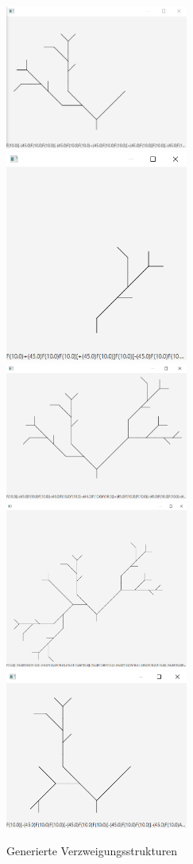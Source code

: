 \begin{figure}[H]
    \includegraphics[width=6cm]{../images/example_1.png}
    \includegraphics[width=6cm]{../images/example_2.png}
    \includegraphics[width=6cm]{../images/example_3.png}
    \includegraphics[width=6cm]{../images/example_4.png}
    \includegraphics[width=6cm]{../images/example_5.png}
    \caption{Generierte Verzweigungsstrukturen}
    \label{resulting_structures}
\end{figure}

